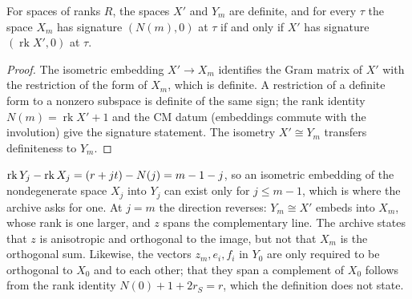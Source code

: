 \begin{lemma}\label{geoa:top-definite}
For spaces of ranks $R$, the spaces $X'$ and $Y_m$ are definite, and for every $\tau$
the space $X_m$ has signature $(N(m),0)$ at $\tau$ if and only if $X'$ has signature
$(\operatorname{rk}X',0)$ at $\tau$.
\end{lemma}
\begin{proof}
The isometric embedding $X'\to X_m$ identifies the Gram matrix of $X'$ with the
restriction of the form of $X_m$, which is definite. A restriction of a definite form
to a nonzero subspace is definite of the same sign; the rank identity
$N(m)=\operatorname{rk}X'+1$ and the CM datum (embeddings commute with the
involution) give the signature statement. The isometry $X'\cong Y_m$ transfers
definiteness to $Y_m$.
\end{proof}

\begin{remark}\label{geoa:rem-top}
$\operatorname{rk} Y_j-\operatorname{rk} X_j=(r+jt)-N(j)=m-1-j$, so an isometric embedding of the nondegenerate
space $X_j$ into $Y_j$ can exist only for $j\le m-1$, which is where the archive asks for
one. At $j=m$ the direction reverses: $Y_m\cong X'$ embeds into $X_m$, whose rank is one
larger, and $z$ spans the complementary line. The archive states that $z$ is anisotropic
and orthogonal to the image, but not that $X_m$ is the orthogonal sum. Likewise, the
vectors $z_m,e_i,f_i$ in $Y_0$ are only required to be orthogonal to $X_0$ and to each
other; that they span a complement of $X_0$ follows from the rank identity
$N(0)+1+2r_S=r$, which the definition does not state.
\end{remark}

